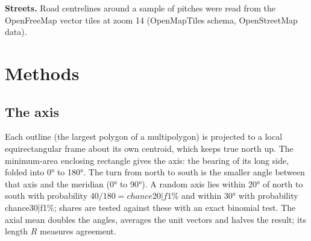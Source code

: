 \documentclass[11pt,a4paper]{article}
\begin{document}
\textbf{Streets.} Road centrelines around a sample of pitches were read from the OpenFreeMap vector tiles \citep{ofm} at zoom 14 (OpenMapTiles schema, OpenStreetMap data).

\section{Methods}
\subsection{The axis}
Each outline (the largest polygon of a multipolygon) is projected to a local equirectangular frame about its own centroid, which keeps true north up. The minimum-area enclosing rectangle \citep{freeman} gives the axis: the bearing of its long side, folded into 0° to 180°. The turn from north to south is the smaller angle between that axis and the meridian (0° to 90°). A random axis lies within 20° of north to south with probability $40/180 = {{chance20|f1}}\%$ and within 30° with probability {{chance30|f1}}\%; shares are tested against these with an exact binomial test. The axial mean doubles the angles, averages the unit vectors and halves the result; its length $R$ measures agreement.
\end{document}
